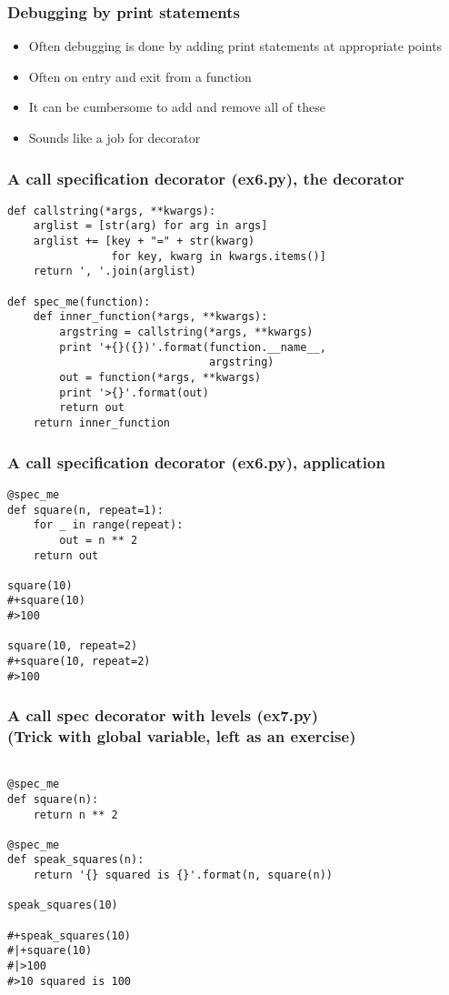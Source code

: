 \documentclass{beamer}
\begin{document}
\begin{frame}
  \frametitle{Debugging by print statements}
  \begin{itemize}
  \item Often debugging is done by adding print statements at appropriate
    points
  \item Often on entry and exit from a function
  \item It can be cumbersome to add and remove all of these
  \item Sounds like a job for decorator
  \end{itemize}
\end{frame}

\begin{frame}[fragile]
  \frametitle{A call specification decorator (ex6.py), the decorator}
\begin{verbatim}
def callstring(*args, **kwargs):
    arglist = [str(arg) for arg in args]
    arglist += [key + "=" + str(kwarg)
                for key, kwarg in kwargs.items()]
    return ', '.join(arglist)

def spec_me(function):
    def inner_function(*args, **kwargs):
        argstring = callstring(*args, **kwargs)
        print '+{}({})'.format(function.__name__,
                               argstring)
        out = function(*args, **kwargs)
        print '>{}'.format(out)
        return out
    return inner_function
\end{verbatim}
\end{frame}

\begin{frame}[fragile]
  \frametitle{A call specification decorator (ex6.py), application}
\begin{verbatim}
@spec_me
def square(n, repeat=1):
    for _ in range(repeat):
        out = n ** 2
    return out

square(10)
#+square(10)
#>100

square(10, repeat=2)
#+square(10, repeat=2)
#>100
\end{verbatim}
\end{frame}

\begin{frame}[fragile]
  \frametitle{A call spec decorator with levels (ex7.py)\\(Trick with global variable, left as an exercise)}
\begin{verbatim}

@spec_me
def square(n):
    return n ** 2

@spec_me
def speak_squares(n):
    return '{} squared is {}'.format(n, square(n))

speak_squares(10)

#+speak_squares(10)
#|+square(10)
#|>100
#>10 squared is 100
\end{verbatim}
\end{frame}
\end{document}
